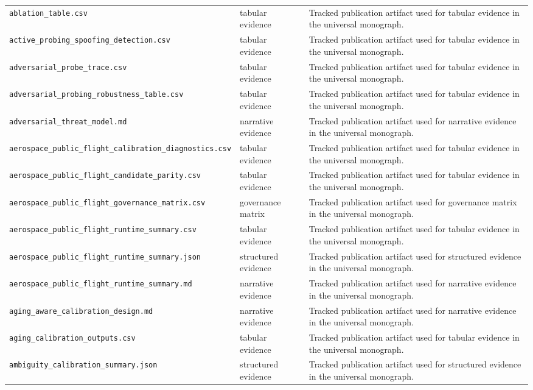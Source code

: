 \begin{longtable}{p{}p{}p{}}
\texttt{ablation\_table.csv} & tabular evidence & Tracked publication artifact used for tabular evidence in the universal monograph.\\
\texttt{active\_probing\_spoofing\_detection.csv} & tabular evidence & Tracked publication artifact used for tabular evidence in the universal monograph.\\
\texttt{adversarial\_probe\_trace.csv} & tabular evidence & Tracked publication artifact used for tabular evidence in the universal monograph.\\
\texttt{adversarial\_probing\_robustness\_table.csv} & tabular evidence & Tracked publication artifact used for tabular evidence in the universal monograph.\\
\texttt{adversarial\_threat\_model.md} & narrative evidence & Tracked publication artifact used for narrative evidence in the universal monograph.\\
\texttt{aerospace\_public\_flight\_calibration\_diagnostics.csv} & tabular evidence & Tracked publication artifact used for tabular evidence in the universal monograph.\\
\texttt{aerospace\_public\_flight\_candidate\_parity.csv} & tabular evidence & Tracked publication artifact used for tabular evidence in the universal monograph.\\
\texttt{aerospace\_public\_flight\_governance\_matrix.csv} & governance matrix & Tracked publication artifact used for governance matrix in the universal monograph.\\
\texttt{aerospace\_public\_flight\_runtime\_summary.csv} & tabular evidence & Tracked publication artifact used for tabular evidence in the universal monograph.\\
\texttt{aerospace\_public\_flight\_runtime\_summary.json} & structured evidence & Tracked publication artifact used for structured evidence in the universal monograph.\\
\texttt{aerospace\_public\_flight\_runtime\_summary.md} & narrative evidence & Tracked publication artifact used for narrative evidence in the universal monograph.\\
\texttt{aging\_aware\_calibration\_design.md} & narrative evidence & Tracked publication artifact used for narrative evidence in the universal monograph.\\
\texttt{aging\_calibration\_outputs.csv} & tabular evidence & Tracked publication artifact used for tabular evidence in the universal monograph.\\
\texttt{ambiguity\_calibration\_summary.json} & structured evidence & Tracked publication artifact used for structured evidence in the universal monograph.\\

\end{longtable}
